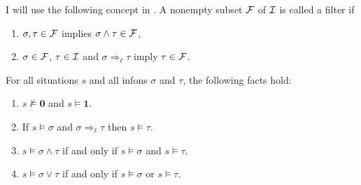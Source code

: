 %

I will use the following concept in . A nonempty subset $\cal F$ of $\cal I$ is called a filter if\largerpage

\begin{enumerate}
\item $\sigma, \tau \in {\cal F}$ implies $\sigma \wedge \tau \in {\cal F}$,
\item $\sigma \in {\cal F}$, $\tau \in {\cal I}$ and $\sigma \Rightarrow_\ell \tau$ imply $\tau \in {\cal F}$. 
\end{enumerate}


For all situations $s$ and all infons $\sigma$ and $\tau$, the following facts hold:\largerpage

\begin{enumerate}
\item $s \nvDash \mathbf{0}$ and $s \vDash \mathbf{1}$.
\item If $s \vDash \sigma$ and $\sigma \Rightarrow_\ell \tau$ then $s \vDash \tau$.
\item $s \vDash \sigma \wedge \tau$ if and only if $s \vDash \sigma$ and $s \vDash \tau$. 
\item $s \vDash \sigma \vee \tau$ if and only if $s \vDash \sigma$ or $s \vDash \tau$.
\end{enumerate}


